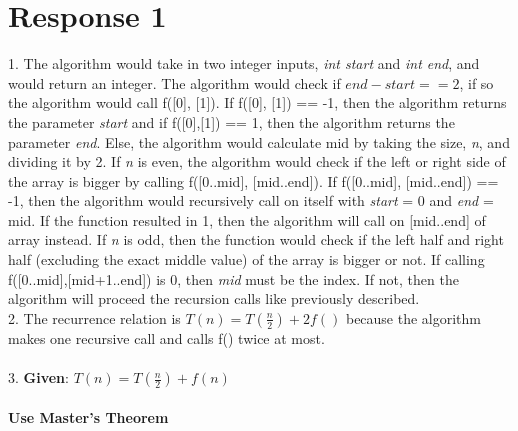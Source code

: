 \documentclass[12pt, a4paper]{article}
\begin{document}
\newenvironment{claim}[1]{\par\noindent\underline{Claim:}\space#1}{}
\newenvironment{basecase}[1]{\par\noindent\underline{Base Case:}\space#1}{}
\newenvironment{inductivehypothesis}[1]{\par\noindent\underline{Inductive Hypothesis:}\space#1}{}
\newenvironment{inductive}[1]{\par\noindent\underline{Inductive Case:}\space#1}{}
\newenvironment{guess}[1]{\par\noindent{Guess:}\space#1}{}
\newenvironment{prove}[1]{\par\noindent{Prove:}\space#1}{}
\maketitle
\section*{\centering Response 1}
    1. The algorithm would take in two integer inputs, \textit{int start} and \textit{int end}, and would return an integer.
    The algorithm would check if \(end - start == 2\), if so the algorithm would call f([0], [1]).
    If f([0], [1]) == -1, then the algorithm returns the parameter \textit{start} and if f([0],[1]) == 1, then the algorithm returns the parameter \textit{end}.
    Else, the algorithm would calculate mid by taking the size, \textit{n}, and dividing it by 2. 
    If \textit{n} is even, the algorithm would check if the left or right side of the array is bigger by calling f([0..mid], [mid..end]).
    If f([0..mid], [mid..end]) == -1, then the algorithm would recursively call on itself with \textit{start} = 0 and \textit{end} = mid.
    If the function resulted in 1, then the algorithm will call on [mid..end] of array instead.
    If \textit{n} is odd, then the function would check if the left half and right half (excluding the exact middle value) of the array is bigger or not.
    If calling f([0..mid],[mid+1..end]) is 0, then \textit{mid} must be the index. If not, then the algorithm will proceed the recursion calls like previously described.\\
    2. The recurrence relation is \(T(n) = T(\frac{n}{2}) + 2f()\) because the algorithm makes one recursive call and calls f() twice at most.\\
    \\
    3. \textbf{Given}: \(T(n) = T(\frac{n}{2}) + f(n)\)\\
    \\
    \textbf{Use Master's Theorem}\\
\end{document}

